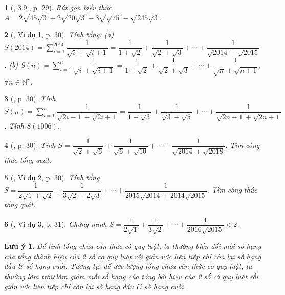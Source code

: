\documentclass{article}
\newtheorem{baitoan}{}%
\newtheorem{luuy}{Lưu ý}
\begin{document}
\begin{baitoan}[\cite{Binh_boi_duong_Toan_9_tap_1}, 3.9., p. 29]
	Rút gọn biểu thức $A = 2\sqrt{45\sqrt{3}} + 2\sqrt{20\sqrt{3}} - 3\sqrt{\sqrt{75}} - \sqrt{245\sqrt{3}}$.
\end{baitoan}

\begin{baitoan}[\cite{Binh_boi_duong_Toan_9_tap_1}, Ví dụ 1, p. 30]
	Tính tổng: (a) $S(2014) = \sum_{i=1}^{2014} \dfrac{1}{\sqrt{i} + \sqrt{i + 1}} = \dfrac{1}{1 + \sqrt{2}} + \dfrac{1}{\sqrt{2} + \sqrt{3}} + \cdots + \dfrac{1}{\sqrt{2014} + \sqrt{2015}}$. (b) $S(n) = \sum_{i=1}^n \dfrac{1}{\sqrt{i} + \sqrt{i + 1}} = \dfrac{1}{1 + \sqrt{2}} + \dfrac{1}{\sqrt{2} + \sqrt{3}} + \cdots + \dfrac{1}{\sqrt{n} + \sqrt{n + 1}}$, $\forall n\in\mathbb{N}^\star$.
\end{baitoan}

\begin{baitoan}[\cite{Binh_boi_duong_Toan_9_tap_1}, p. 30]
	Tính $S(n) = \sum_{i=1}^n \dfrac{1}{\sqrt{2i - 1} + \sqrt{2i + 1}} = \dfrac{1}{1 + \sqrt{3}} + \dfrac{1}{\sqrt{3} + \sqrt{5}} + \cdots + \dfrac{1}{\sqrt{2n - 1} + \sqrt{2n + 1}}$. Tính $S(1006)$.
\end{baitoan}

\begin{baitoan}[\cite{Binh_boi_duong_Toan_9_tap_1}, p. 30]
	Tính $S = \dfrac{1}{\sqrt{2} + \sqrt{6}} + \dfrac{1}{\sqrt{6} + \sqrt{10}} + \cdots + \dfrac{1}{\sqrt{2014} + \sqrt{2018}}$. Tìm công thức tổng quát.
\end{baitoan}

\begin{baitoan}[\cite{Binh_boi_duong_Toan_9_tap_1}, Ví dụ 2, p. 30]
	Tính tổng $S = \dfrac{1}{2\sqrt{1} + \sqrt{2}} + \dfrac{1}{3\sqrt{2} + 2\sqrt{3}} + \cdots + \dfrac{1}{2015\sqrt{2014} + 2014\sqrt{2015}}$. Tìm công thức tổng quát.
\end{baitoan}

\begin{baitoan}[\cite{Binh_boi_duong_Toan_9_tap_1}, Ví dụ 3, p. 31]
	Chứng minh $S = \dfrac{1}{2\sqrt{1}} + \dfrac{1}{3\sqrt{2}} + \cdots + \dfrac{1}{2016\sqrt{2015}} < 2$.
\end{baitoan}

\begin{luuy}
	Để tính tổng chứa căn thức có quy luật, ta thường biến đổi mỗi số hạng của tổng thành hiệu của 2 số có quy luật rồi giản ước liên tiếp chỉ còn lại số hạng đầu \& số hạng cuối. Tương tự, để ước lượng tổng chứa căn thức có quy luật, ta thường làm trội{\tt/}làm giảm mỗi số hạng của tổng bởi hiệu của 2 số có quy luật rồi giản ước liên tiếp chỉ còn lại số hạng đầu \& số hạng cuối.
\end{luuy}
\end{document}

